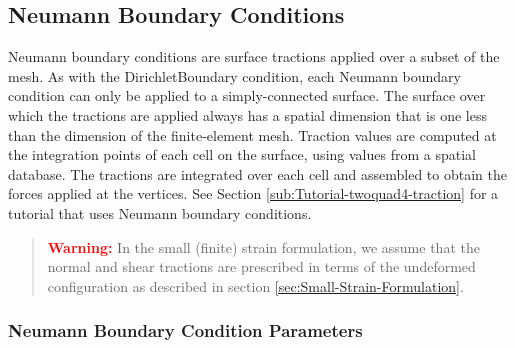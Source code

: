 \subsection{Neumann Boundary Conditions}

Neumann boundary conditions are surface tractions applied over a subset
of the mesh. As with the DirichletBoundary condition, each Neumann
boundary condition can only be applied to a simply-connected surface.
The surface over which the tractions are applied always has a spatial
dimension that is one less than the dimension of the finite-element
mesh. Traction values are computed at the integration points of each
cell on the surface, using values from a spatial database. The tractions
are integrated over each cell and assembled to obtain the forces applied
at the vertices. See Section \vref{sub:Tutorial-twoquad4-traction}
for a tutorial that uses Neumann boundary conditions.
\begin{quote}
\textbf{\textcolor{red}{Warning:}}\textbf{ }In the small (finite)
strain formulation, we assume that the normal and shear tractions
are prescribed in terms of the undeformed configuration as described
in section \vref{sec:Small-Strain-Formulation}.
\end{quote}

\subsubsection{Neumann Boundary Condition Parameters}

